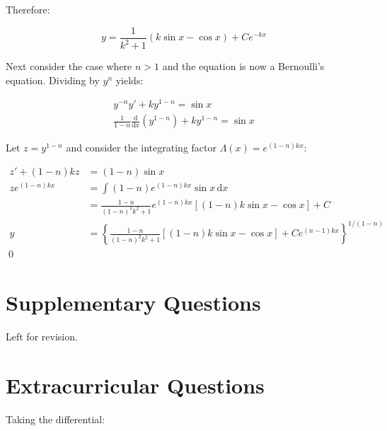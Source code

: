 \documentclass[12pt]{article}
\begin{document}
Therefore:

\begin{equation}
    y = \frac{1}{k^{2} + 1} \left( k \sin{x} - \cos{x} \right) + C e^{-kx}
\end{equation}

Next consider the case where $n > 1$ and the equation is now a Bernoulli's equation. Dividing by $y^{n}$ yields:

\begin{equation}
    \begin{split}
        y^{-n} y' + k y^{1-n} = \sin{x} \\
        \frac{1}{1 - n} \frac{\mathrm{d}}{\mathrm{d}x} \left( y^{1 - n} \right) + k y^{1-n} = \sin{x}
    \end{split}
\end{equation}

Let $z = y^{1 - n}$ and consider the integrating factor $\Lambda(x) = e^{(1 - n)kx}$:

\begin{equation}
    \begin{split}
        z' + (1 - n)kz &= (1 - n) \sin{x} \\
        z e^{(1 - n)kx} &= \int (1 - n) e^{(1 - n)kx} \sin{x} \, \mathrm{d}x \\
        &= \frac{1 - n}{(1 - n)^{2} k^{2} + 1} e^{(1 - n)kx} \left[ (1 - n)k \sin{x} - \cos{x} \right] + C\\
        y &= \left\{ \frac{1 - n}{(1 - n)^{2} k^{2} + 1} \left[ (1 - n)k \sin{x} - \cos{x} \right] + C e^{(n - 1)kx} \right\}^{1/(1 - n)}
    \end{split}
\end{equation}
\qed

\pagebreak
\section*{Supplementary Questions}


Left for revision.


\pagebreak
\section*{Extracurricular Questions}



Taking the differential:
\end{document}
